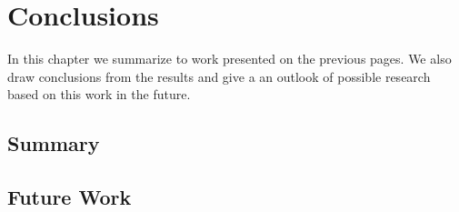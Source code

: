 \chapter{Conclusions} \label{chapter:conclusions}

In this chapter we summarize to work presented on the previous pages. We also draw conclusions from the results and give a an outlook of possible research based on this work in the future.

\section{Summary}

\section{Future Work}